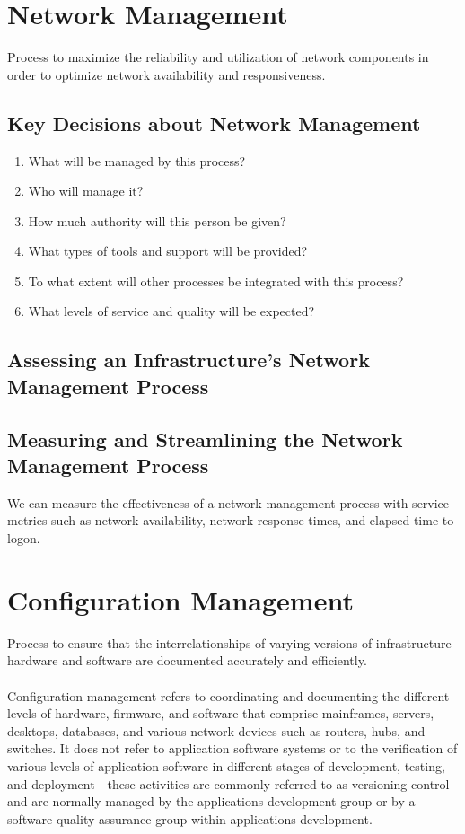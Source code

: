\documentclass[8pt,a4]{extarticle}
\begin{document}
\begin{multicols}{3}
\section{Network Management}
Process to maximize the reliability and utilization of network components in order to optimize network availability 
and responsiveness.


\subsection{Key Decisions about Network Management}
\begin{enumerate}
\item What will be managed by this process?
\item Who will manage it?
\item How much authority will this person be given?
\item What types of tools and support will be provided?
\item To what extent will other processes be integrated with this process?
\item What levels of service and quality will be expected?
\end{enumerate}

\subsection{Assessing an Infrastructure’s Network Management Process}
\subsection{Measuring and Streamlining the Network Management Process}
We can measure the effectiveness of a network management process with service metrics such as network availability, 
network response times, and elapsed time to logon.

\section{Configuration Management}
Process to ensure that the interrelationships of varying versions of infrastructure hardware and software are
documented accurately and efficiently. \\
\\
Configuration management refers to coordinating and documenting the different levels of hardware, firmware, and 
software that comprise mainframes, servers, desktops, databases, and various network devices such as routers, hubs,
and switches. It does not refer to application software systems or to the verification of various levels of application
software in different stages of development, testing, and deployment—these activities are commonly referred to as
versioning control and are normally managed by the applications development group or by a software quality assurance 
group within applications development.


\end{multicols}
\end{document}
